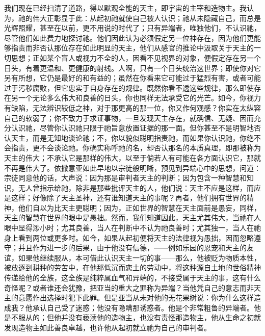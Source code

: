 我们现在已经扫清了道路，得以默观全能的天主，即宇宙的主宰和造物主。我认为，祂的伟大正彰显于此：从起初祂就使自己被人认识；祂从未隐藏自己，而总是光辉照耀，甚至在以前，更不用说的时代了；只有异端者，唯独他们，不认识祂，尽管他们如此费力地探讨祂。他们因此认为必须假定另一位神存在，因为他们更能够指责而非否认那位存在如此明显的天主，他们从感官的推论中汲取关于天主的一切思想；正如某个盲人或视力不全的人，因看不见视界的对象，便假定存在另一个日头，有着更温和、更健康的射线。人啊，只有一个日头统治这世界；即使你对它另有所想，它仍是最好的和有益的；虽然在你看来它可能过于猛烈有害，或者可能过于污秽腐败，但它忠实于自身存在的规律。既然你看不透这些规律，那么即使存在另一个无论多么伟大和良善的日头，你也同样无法承受它的光芒。如今，你视力有缺陷，无法辨识较低之神，对于那更高的那一位，你又作何观感？你实在太纵容自己的软弱了；你不致力于求证事物，一旦发现天主存在，就确信、无疑、因而充分认识祂，尽管你认识祂只限于祂旨意放置证据的那一面。但你甚至不是明智地否认天主，而是无知地谈论祂；不，你以貌似聪明指责祂，而如果你认识祂，你绝不会指责，更不会谈论祂。你确实称呼祂的名，却否认那名的本质真理，即那被称为天主的伟大；不承认它是那样的伟大，以至于倘若人有可能在各方面认识它，那就不再是伟大了。依撒意亚如此早地以宗徒般明晰，预见到异端心中的思想，问道：宗徒同意他的话，大声说：因为那是审判者天主的判断；因为包含一种智慧和知识，无人曾指示给祂，除非是那些批评天主的人，他们说：天主不应是这样，而应是这样；好像除了天主圣神，还有谁知道天主的事呢？再者，他们拥有世界的精神，他们自以为比天主更聪明；因为，正如世界的智慧在天主面前是愚妄，同样，天主的智慧在世界的眼中是愚拙。然而，我们知道因此，天主尤其伟大，当祂在人眼中显得渺小时；尤其良善，当人在判断中不认为祂良善时；尤其独一，当人在祂身上看到两位或更多时。如今，如果从起初便将天主的法律视为愚拙，因而忽略遵守；并且作为进一步的后果，由于他没有信德，——例如乐园的恩宠和天主的友谊，如果他继续服从，本可借此认识天主一切的事——那么，他被贬为物质本性，被放逐到耕种的劳苦中，在他那低沉而恋土的劳动中，将这种源自土地的世俗精神传递给他的全族，这全族是纯粹属血气和异端的，不接受属于天主的事，这有什么奇怪呢？或者谁还会犹豫，把亚当的重大之罪称为异端？当他凭自己的意志而非天主的意愿作出选择时犯下此罪。但是亚当从未对他的无花果树说：你为什么这样造成我？他承认自己受了迷惑；他没有隐瞒那诱惑者。他是个非常粗鲁的异端者。他是不服从的；但他并没有亵渎他的造物主，也没有责怪那造物主，他从生命之初就发现造物主如此善良卓越，也许他从起初就立祂为自己的审判者。\par

